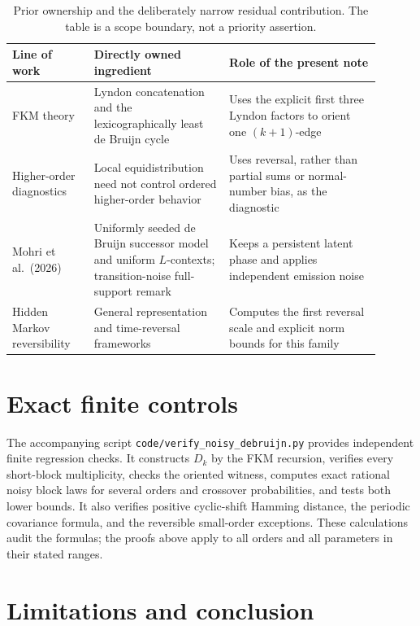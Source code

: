 \documentclass[11pt,a4paper]{amsart}
\theoremstyle{definition}
\theoremstyle{remark}
\begin{document}
\begin{table}[ht]
\centering
\small
\begin{tabular}{
  >{\raggedright\arraybackslash}p{0.20\linewidth}
  >{\raggedright\arraybackslash}p{0.33\linewidth}
  >{\raggedright\arraybackslash}p{0.37\linewidth}}
\toprule
Line of work & Directly owned ingredient & Role of the present note\\
\midrule
FKM theory
& Lyndon concatenation and the lexicographically least de Bruijn cycle
& Uses the explicit first three Lyndon factors to orient one $(k+1)$-edge\\
Higher-order diagnostics
& Local equidistribution need not control ordered higher-order behavior
& Uses reversal, rather than partial sums or normal-number bias, as the diagnostic\\
Mohri et al.\ (2026)
& Uniformly seeded de Bruijn successor model and uniform $L$-contexts; transition-noise full-support remark
& Keeps a persistent latent phase and applies independent emission noise\\
Hidden Markov reversibility
& General representation and time-reversal frameworks
& Computes the first reversal scale and explicit norm bounds for this family\\
\bottomrule
\end{tabular}
\caption{Prior ownership and the deliberately narrow residual contribution.
The table is a scope boundary, not a priority assertion.}
\label{tab:ownership}
\end{table}

\section{Exact finite controls}

The accompanying script
\texttt{code/verify\_noisy\_debruijn.py} provides independent finite
regression checks.  It constructs $D_k$ by the FKM recursion, verifies every
short-block multiplicity, checks the oriented witness, computes exact
rational noisy block laws for several orders and crossover probabilities,
and tests both lower bounds.  It also verifies positive cyclic-shift Hamming
distance, the periodic covariance formula, and the reversible small-order
exceptions.  These calculations audit the formulas; the proofs above apply
to all orders and all parameters in their stated ranges.

\section{Limitations and conclusion}
\end{document}
